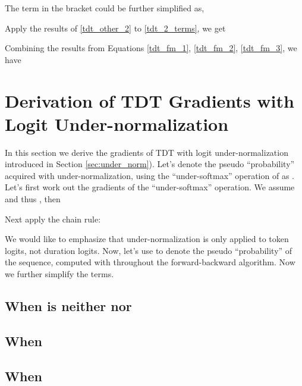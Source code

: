 \documentclass{article}
\begin{document}
The term in the bracket could be further simplified as,

Apply the results of \ref{tdt_other_2} to \ref{tdt_2_terms}, we get

Combining the results from Equations \ref{tdt_fm_1}, \ref{tdt_fm_2}, \ref{tdt_fm_3}, we have


\section{Derivation of TDT Gradients with Logit Under-normalization}
In this section we derive the gradients of TDT with logit under-normalization introduced in Section \ref{sec:under_norm}). 
Let's denote the pseudo ``probability'' acquired with under-normalization, using the ``under-softmax'' operation of  as . Let's first work out the gradients of the ``under-softmax'' operation. We assume  and thus , then

Next apply the chain rule:

We would like to emphasize that under-normalization is only applied to token logits, not duration logits. 
Now, let's use  to denote the pseudo ``probability'' of the sequence, computed with  throughout the forward-backward algorithm. Now we further simplify the terms. 

\subsection{When  is neither  nor }


\subsection{When }



\subsection{When }
\end{document}
